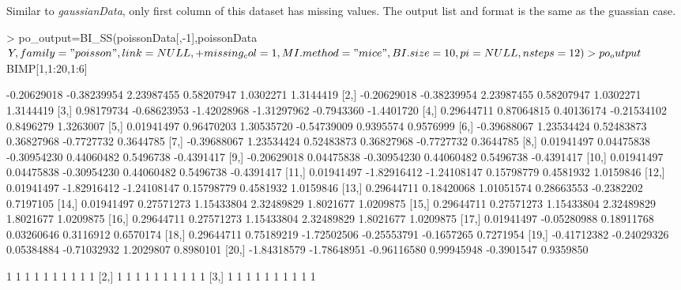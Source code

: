 \documentclass[a4paper]{article}
\begin{document}
Similar to \emph{gaussianData}, only first column of this dataset has missing values.  The output list and format is the same as the guassian case.
\begin{Schunk}
\begin{Sinput}
> po_output=BI_SS(poissonData[,-1],poissonData$Y,family="poisson",link=NULL,
+                 missing_col=1,MI.method="mice",BI.size=10,pi=NULL,nsteps=12)
> po_output$BIMP[1,1:20,1:6]
\end{Sinput}
\begin{Soutput}
             [,1]        [,2]        [,3]        [,4]       [,5]       [,6]
 [1,] -0.20629018 -0.38239954  2.23987455  0.58207947  1.0302271  1.3144419
 [2,] -0.20629018 -0.38239954  2.23987455  0.58207947  1.0302271  1.3144419
 [3,]  0.98179734 -0.68623953 -1.42028968 -1.31297962 -0.7943360 -1.4401720
 [4,]  0.29644711  0.87064815  0.40136174 -0.21534102  0.8496279  1.3263007
 [5,]  0.01941497  0.96470203  1.30535720 -0.54739009  0.9395574  0.9576999
 [6,] -0.39688067  1.23534424  0.52483873  0.36827968 -0.7727732  0.3644785
 [7,] -0.39688067  1.23534424  0.52483873  0.36827968 -0.7727732  0.3644785
 [8,]  0.01941497  0.04475838 -0.30954230  0.44060482  0.5496738 -0.4391417
 [9,] -0.20629018  0.04475838 -0.30954230  0.44060482  0.5496738 -0.4391417
[10,]  0.01941497  0.04475838 -0.30954230  0.44060482  0.5496738 -0.4391417
[11,]  0.01941497 -1.82916412 -1.24108147  0.15798779  0.4581932  1.0159846
[12,]  0.01941497 -1.82916412 -1.24108147  0.15798779  0.4581932  1.0159846
[13,]  0.29644711  0.18420068  1.01051574  0.28663553 -0.2382202  0.7197105
[14,]  0.01941497  0.27571273  1.15433804  2.32489829  1.8021677  1.0209875
[15,]  0.29644711  0.27571273  1.15433804  2.32489829  1.8021677  1.0209875
[16,]  0.29644711  0.27571273  1.15433804  2.32489829  1.8021677  1.0209875
[17,]  0.01941497 -0.05280988  0.18911768  0.03260646  0.3116912  0.6570174
[18,]  0.29644711  0.75189219 -1.72502506 -0.25553791 -0.1657265  0.7271954
[19,] -0.41712382 -0.24029326  0.05384884 -0.71032932  1.2029807  0.8980101
[20,] -1.84318579 -1.78648951 -0.96116580  0.99945948 -0.3901547  0.9359850
\end{Soutput}
\begin{Soutput}
      [,1] [,2] [,3] [,4] [,5] [,6] [,7] [,8] [,9] [,10]
 [1,]    1    1    1    1    1    1    1    1    1     1
 [2,]    1    1    1    1    1    1    1    1    1     1
 [3,]    1    1    1    1    1    1    1    1    1     1

\end{Soutput}
\end{Schunk}
\end{document}
